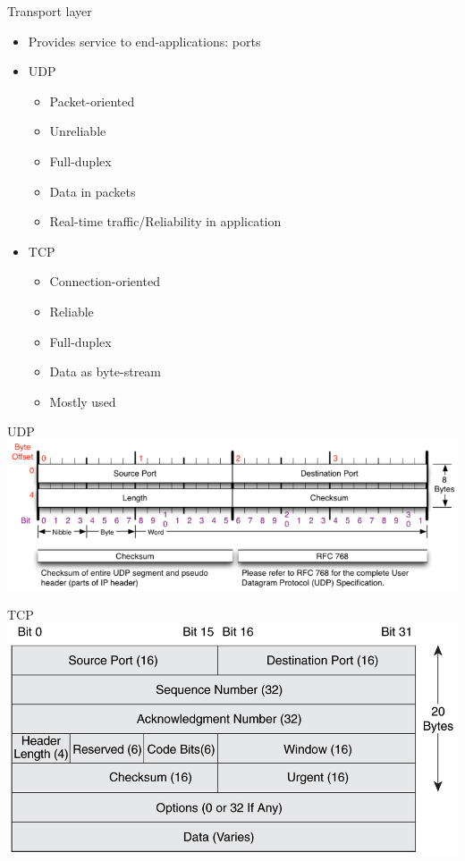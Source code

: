 \documentclass{beamer}
\begin{document}
\begin{frame}{Transport layer}
  \begin{itemize}
  \item Provides service to end-applications: ports
  \item UDP
    \begin{itemize}
      \item Packet-oriented
      \item Unreliable
      \item Full-duplex
      \item Data in packets
      \item Real-time traffic/Reliability in application
    \end{itemize}
  \item TCP
    \begin{itemize}
      \item Connection-oriented
      \item Reliable
      \item Full-duplex
      \item Data as byte-stream
      \item Mostly used
    \end{itemize}
  \end{itemize}
\end{frame}

\begin{frame}{UDP}
    \includegraphics[width=0.9\linewidth]{udp}
\end{frame}

\begin{frame}{TCP}
    \includegraphics[width=0.9\linewidth]{tcp}
\end{frame}
\end{document}
